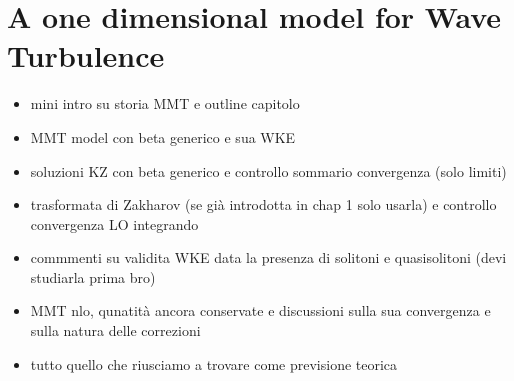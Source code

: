 

\newpage
\vphantom{}
\section{A one dimensional model for Wave Turbulence}

\begin{itemize}
    \item mini intro su storia MMT e outline capitolo
    \item MMT model con beta generico e sua WKE
    \item soluzioni KZ con beta generico e controllo sommario convergenza (solo limiti)
    \item trasformata di Zakharov (se già introdotta in chap 1 solo usarla) e controllo convergenza LO integrando
    \item commmenti su validita WKE data la presenza di solitoni e quasisolitoni (devi studiarla prima bro)
    \item MMT nlo, qunatità ancora conservate e discussioni sulla sua convergenza e sulla natura delle correzioni
    \item tutto quello che riusciamo a trovare come previsione teorica 
\end{itemize}



